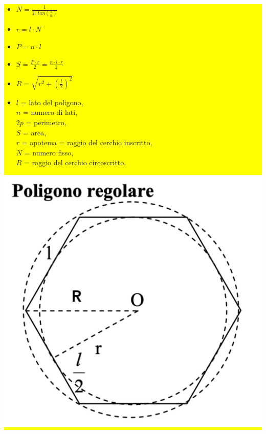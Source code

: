 \documentclass[11pt]{article}
\begin{document}
\colorbox{yellow}{\begin{minipage}{10cm}
\begin{itemize}
  \item $N = \frac{1}{2 \cdot tan(\frac{\pi}{n})}$
 \item $r = l \cdot N$
 \item $P = n\cdot l$
  \item $S = \frac{P\cdot r}{2} =  \frac{n\cdot l \cdot r}{2}$

  \item $R=\sqrt{r^2 + \left ( \frac{l}{2} \right ) ^2}$
  \item $l$ = lato del poligono,\\ $n$ = numero di lati,  \\$2p$ = perimetro, \\$S$ = area, \\ $r$ = apotema = raggio del cerchio inscritto,\\$N$ = numero fisso,\\ $R$ = raggio del cerchio circoscritto.
 \end{itemize}
\end{minipage}
    \begin{minipage}{0.5\textwidth}
        \begin{center}
        \includegraphics[scale=0.4]{poligono.png}
        \end{center}
    \end{minipage}}
\end{document}
